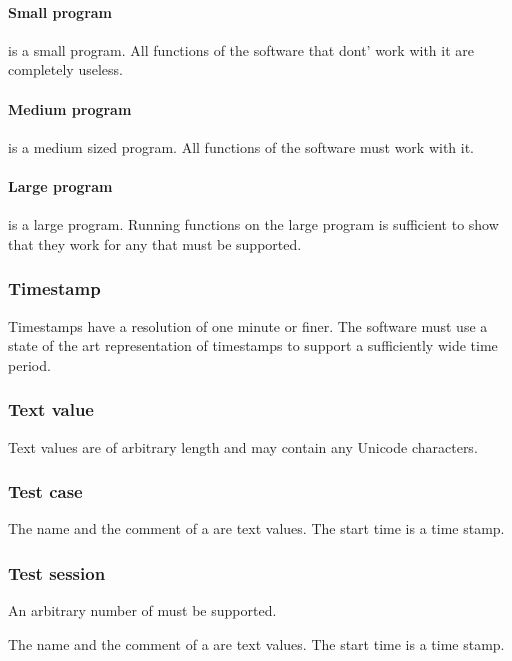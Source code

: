\paragraph{Small program} \label{nf:Small program}
 is a small program. All functions of the software that dont' work with it are completely useless.
\paragraph{Medium program} \label{nf:Medium program}
 is a medium sized program. All functions of the software must work with it.
\paragraph{Large program} \label{nf:Large program}
 is a large program. Running functions on the large program is sufficient to show that they work for any  that must be supported.

\subsubsection{Timestamp}
Timestamps have a resolution of one minute or finer. The software must use a state of the art representation of timestamps to support a sufficiently wide time period.

\subsubsection{Text value}
Text values are of arbitrary length and may contain any Unicode characters.

\subsubsection{Test case}
The name and the comment of a  are text values. The start time is a time stamp.

\subsubsection{Test session}
An arbitrary number of  must be supported.
\par
The name and the comment of a  are text values. The start time is a time stamp.

